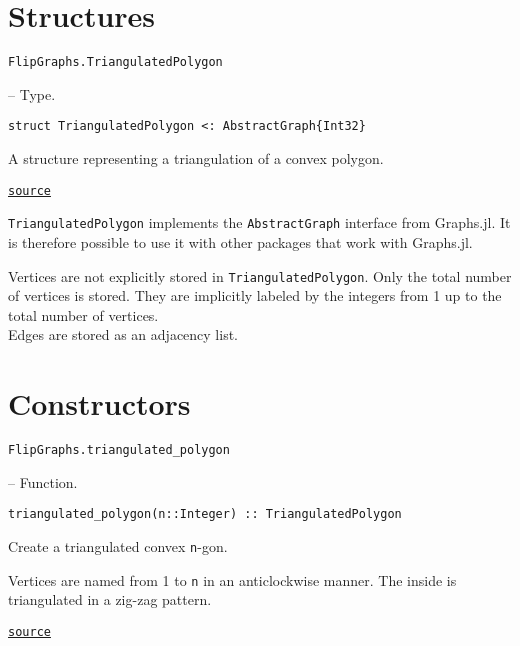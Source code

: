 \section{Structures}



\label{15035490444877811912}{}

\hypertarget{6755725597592837229}{\texttt{FlipGraphs.TriangulatedPolygon}}  -- {Type.}

\begin{adjustwidth}{2em}{0pt}


\begin{verbatim}
struct TriangulatedPolygon <: AbstractGraph{Int32}
\end{verbatim}

A structure representing a triangulation of a convex polygon.



\href{https://github.com/schto223/FlipGraphs.jl/blob/490c01a7adf74b42f27dda05099165c47ae8133e/src/polygonTriangulations.jl#L1-L5}{\texttt{source}}


\end{adjustwidth}

\texttt{TriangulatedPolygon} implements the \texttt{AbstractGraph} interface from Graphs.jl. It is therefore possible to use it with other packages that work with Graphs.jl.



Vertices are not explicitly stored in \texttt{TriangulatedPolygon}.  Only the total number of vertices is stored. They are implicitly labeled by the integers from 1 up to the total number of vertices.\\
Edges are stored as an adjacency list.



\section{Constructors}



\label{1468722345706912774}{}

\hypertarget{11161655937638359151}{\texttt{FlipGraphs.triangulated\_polygon}}  -- {Function.}

\begin{adjustwidth}{2em}{0pt}


\begin{verbatim}
triangulated_polygon(n::Integer) :: TriangulatedPolygon
\end{verbatim}

Create a triangulated convex \texttt{n}-gon. 

Vertices are named from 1 to \texttt{n} in an anticlockwise manner. The inside is triangulated in a zig-zag pattern.



\href{https://github.com/schto223/FlipGraphs.jl/blob/490c01a7adf74b42f27dda05099165c47ae8133e/src/polygonTriangulations.jl#L27-L34}{\texttt{source}}


\end{adjustwidth}

